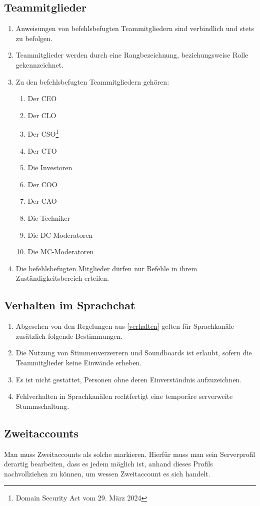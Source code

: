 \documentclass{article}
\begin{document}
\subsection{Teammitglieder}\label{members}
\begin{enumerate}[(1)]
	\item Anweisungen von befehlsbefugten Teammitgliedern sind verbindlich und stets zu befolgen.
	\item Teammitglieder werden durch eine Rangbezeichnung, beziehungsweise Rolle gekennzeichnet.
	\item Zu den befehlsbefugten Teammitgliedern gehören:
	\begin{enumerate}
		\item Der CEO
		\item Der CLO
		\item Der CSO\footnote{Domain Security Act vom 29. März 2024}
		\item Der CTO
		\item Die Investoren
		\item Der COO
		\item Der CAO
		\item Die Techniker
		\item Die DC-Moderatoren
		\item Die MC-Moderatoren
	\end{enumerate}
	\item Die befehlsbefugten Mitglieder dürfen nur Befehle in ihrem Zuständigkeitsbereich erteilen.
\end{enumerate}

\subsection{Verhalten im Sprachchat}
\begin{enumerate}[(1)]
	\item Abgesehen von den Regelungen aus \ref{verhalten} gelten für Sprachkanäle zusätzlich folgende Bestimmungen.
	\item Die Nutzung von Stimmenverzerrern und Soundboards ist erlaubt, sofern die Teammitglieder keine Einwände erheben.
	\item Es ist nicht gestattet, Personen ohne deren Einverständnis aufzuzeichnen.
	\item Fehlverhalten in Sprachkanälen rechtfertigt eine temporäre serverweite Stummschaltung.
\end{enumerate}

\subsection{Zweitaccounts}
Man muss Zweitaccounts als solche markieren. Hierfür muss man sein Serverprofil derartig bearbeiten, dass es jedem möglich ist, anhand dieses Profils nachvollziehen zu können, um wessen Zweitaccount es sich handelt.
\end{document}
